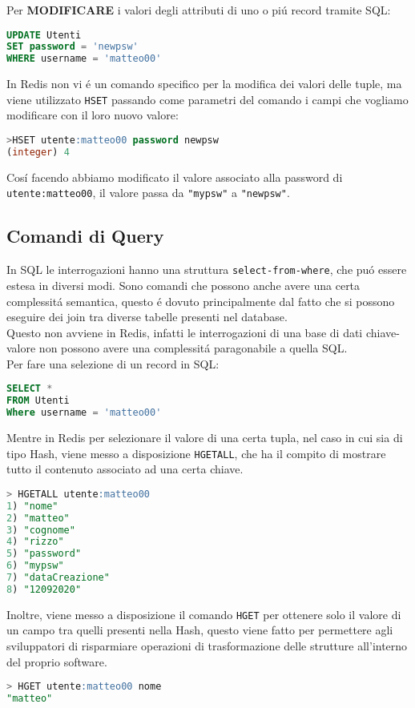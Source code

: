 Per \textbf{MODIFICARE} i valori degli attributi di uno o piú record tramite SQL:
\begin{lstlisting}[autogobble, style=redis-cli, language=SQL]
UPDATE Utenti
SET password = 'newpsw'
WHERE username = 'matteo00'\end{lstlisting}

In Redis non vi é un comando specifico per la modifica dei valori delle tuple, ma viene utilizzato \texttt{HSET} passando come parametri del comando
i campi che vogliamo modificare con il loro nuovo valore:
\begin{lstlisting}[autogobble, style=redis-cli, language=SQL]
>HSET utente:matteo00 password newpsw
(integer) 4\end{lstlisting}
Cosí facendo abbiamo modificato il valore associato alla password di \texttt{utente:matteo00}, il valore passa da \texttt{"mypsw"} a \texttt{"newpsw"}.

\subsection{Comandi di Query}
In SQL le interrogazioni hanno una struttura \texttt{select-from-where}, che puó essere estesa in diversi modi. Sono comandi
che possono anche avere una certa complessitá semantica, questo é dovuto principalmente dal fatto che si possono eseguire dei join
tra diverse tabelle presenti nel database.\\
Questo non avviene in Redis, infatti le interrogazioni di una base di dati chiave-valore non possono avere una complessitá paragonabile a quella SQL.\\

Per fare una selezione di un record in SQL:
\begin{lstlisting}[autogobble,style=redis-cli, language=SQL]
SELECT *
FROM Utenti
Where username = 'matteo00'\end{lstlisting}

Mentre in Redis per selezionare il valore di una certa tupla, nel caso in cui sia di tipo Hash, viene messo a disposizione \texttt{HGETALL}, che ha il compito di mostrare tutto
il contenuto associato ad una certa chiave.
\begin{lstlisting}[autogobble, style=redis-cli, language=SQL]
> HGETALL utente:matteo00
1) "nome"
2) "matteo"
3) "cognome"
4) "rizzo"
5) "password"
6) "mypsw"
7) "dataCreazione"
8) "12092020"
\end{lstlisting}

Inoltre, viene messo a disposizione il comando \texttt{HGET} per ottenere solo il valore di un campo tra quelli presenti nella Hash, questo viene fatto per permettere
agli sviluppatori di risparmiare operazioni di trasformazione delle strutture all'interno del proprio software.
\begin{lstlisting}[autogobble, style=redis-cli, language=SQL]
> HGET utente:matteo00 nome
"matteo"
\end{lstlisting}

